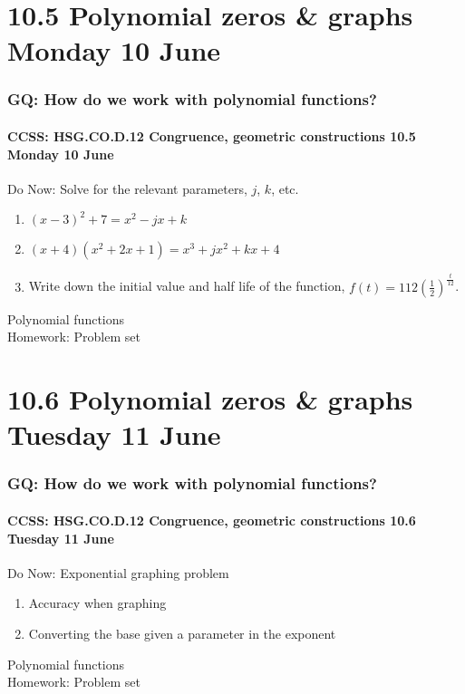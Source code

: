 \documentclass{beamer}
\begin{document}
\section{10.5 Polynomial zeros \& graphs Monday 10 June}
  \frame
  {
    \frametitle{GQ: How do we work with polynomial functions?}
    \framesubtitle{CCSS: HSG.CO.D.12 Congruence, geometric constructions \hfill \alert{10.5 Monday 10 June}}

    \begin{block}{Do Now: Solve for the relevant parameters, $j$, $k$, etc.}
      \begin{enumerate}
        \item $(x-3)^2+7=x^2-jx+k$
        \item $(x+4)(x^2+2x+1)=x^3+jx^2+kx+4$
        \item Write down the initial value and half life of the function, $\displaystyle f(t)=112 \left( \frac{1}{2} \right)^{\frac{t}{12}}$.
      \end{enumerate}
    \end{block}
    Polynomial functions\\[0.25cm]
    Homework: Problem set
  }

\section{10.6 Polynomial zeros \& graphs Tuesday 11 June}
  \frame
  {
    \frametitle{GQ: How do we work with polynomial functions?}
    \framesubtitle{CCSS: HSG.CO.D.12 Congruence, geometric constructions \hfill \alert{10.6 Tuesday 11 June}}

    \begin{block}{Do Now: Exponential graphing problem}
      \begin{enumerate}
        \item Accuracy when graphing
        \item Converting the base given a parameter in the exponent 
      \end{enumerate}
    \end{block}
    Polynomial functions\\[0.25cm]
    Homework: Problem set
  }
\end{document}
